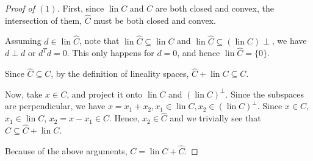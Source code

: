 \begin{proof}[Proof of \( (1) \)]
  First, since \( \operatorname{lin} C \) and \( C \) are both closed and
  convex, the intersection of them, \( \hat{C} \) must be both closed and
  convex.

  Assuming \( d \in \operatorname{lin} \hat{C} \), note that \(
  \operatorname{lin} \hat{C} \subseteq \operatorname{lin} C \) and \(
  \operatorname{lin} \hat{C} \subseteq (\operatorname{lin} C)\perp  \), we have
  \( d \perp d \) or \( d^{T}d = 0 \). This only happens for \( d = 0 \), and
  hence \( \operatorname{lin} \hat{C} = \{0\}   \).

  Since \( \hat{C} \subseteq C \), by the definition of lineality spaces, \(
  \hat{C} + \operatorname{lin} C \subseteq C \).

  Now, take \( x \in C \), and project it onto \( \operatorname{lin} C \) and \(
  (\operatorname{lin} C)^{\perp }\). Since the subspaces are perpendicular, we
  have \( x = x_{1} + x_{2}, x_{1} \in \operatorname{lin} C, x_{2} \in
  (\operatorname{lin} C)^{\perp } \). Since \( x \in C \), \( x_{1} \in
  \operatorname{lin} C \), \( x_{2} = x - x_{1} \in C \). Hence, \( x_{2} \in
  \hat{C} \) and we trivially see that \( C \subseteq \hat{C} +
  \operatorname{lin} C \).

  Because of the above arguments, \( C = \operatorname{lin} C + \hat{C} \).
\end{proof}

